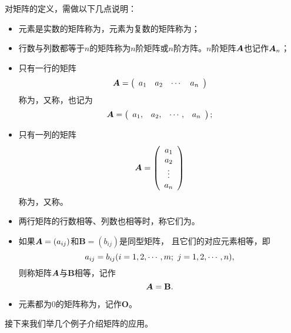 \begin{zhu*}
  对矩阵的定义，需做以下几点说明：
  \begin{itemize}
  \item 
    元素是实数的矩阵称为，元素为复数的矩阵称为；
  \item
    行数与列数都等于$n$的矩阵称为$n$阶矩阵或$n$阶方阵。$n$阶矩阵$\boldsymbol{A}$也记作$\boldsymbol{A}_n$；
  \item
    只有一行的矩阵
    $$
    \boldsymbol{A} = \left(
    \begin{array}{cccc}
      a_1 & a_2 & \cdots & a_n
    \end{array}
    \right )
    $$
    称为，又称，也记为
    $$
    \boldsymbol{A} = \left(
    \begin{array}{cccc}
      a_1, & a_2, & \cdots, & a_n
    \end{array}
    \right );
    $$
  \item
    只有一列的矩阵
    $$
    \boldsymbol{A} = \left(
    \begin{array}{c}
      a_1 \\
      a_2 \\
      \vdots \\
      a_n
    \end{array}
    \right )
    $$
    称为，又称。
  \item 
    两行矩阵的行数相等、列数也相等时，称它们为。
  \item
    如果$\boldsymbol{A}=(a_{ij})$和$\mathbf{B}=(b_{ij})$是同型矩阵，
    且它们的对应元素相等，即
    $$
    a_{ij} = b_{ij}(i=1,2,\cdots,m; \ j =1,2,\cdots,n),
    $$
    则称矩阵$\boldsymbol{A}$与$\mathbf{B}$相等，记作
    $$
    \boldsymbol{A} = \mathbf{B}.
    $$
  \item
    元素都为0的矩阵称为，记作{$\mathbf{O}$}。
  \end{itemize}
\end{zhu*}
\vspace{.1in} \noindent
接下来我们举几个例子介绍矩阵的应用。

